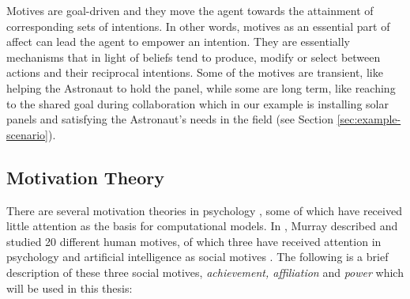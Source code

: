 \documentclass[12pt]{report}
\begin{document}
Motives are goal-driven and they move the agent towards the attainment of
corresponding sets of intentions. In other words, motives as an essential part
of affect can lead the agent to empower an intention. They are essentially
mechanisms that in light of beliefs tend to produce, modify or select between
actions and their reciprocal intentions. Some of the motives are transient, like
helping the Astronaut to hold the panel, while some are long term, like reaching
to the shared goal during collaboration which in our example is installing solar
panels and satisfying the Astronaut's needs in the field (see Section
\ref{sec:example-scenario}).

\subsection{Motivation Theory}
\label{section-motivation-theory}

There are several motivation theories in psychology \cite{beck:motivation,
graham:motivation, laming:understanding-motivation}, some of which have received
little attention as the basis for computational models. In
\cite{murray:personality-exploration}, Murray described and studied 20 different
human motives, of which three have received attention in psychology and
artificial intelligence as social motives
\cite{merrick:acheievement-affiliation-power,
zurbriggen:linking-motives-emotions}. The following is a brief description of
these three social motives, \textit{achievement, affiliation} and \textit{power}
\cite{atkinson:motives-action-society,zurbriggen:linking-motives-emotions}
which will be used in this thesis:
\end{document}

